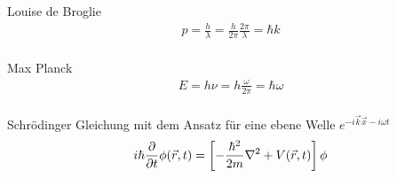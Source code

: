 




{\Huge
Louise de Broglie
\\
\begin{align*}
p=\frac{h}{\lambda} = \frac{h}{2\pi}\frac{2\pi}{\lambda} =\hbar k
\end{align*}
\\
Max Planck
\\
\begin{align*}
E=h\nu=h\frac{\omega}{2\pi} =\hbar \omega
\end{align*}
\\
Schr\"{o}dinger Gleichung mit dem Ansatz f\"{u}r eine ebene Welle \(e^{-i\vec k\vec x-i\omega t}\)
\\
 \begin{align*}
 i\hbar\pdiff_t \phi (\vec r,t)  = \left[-\frac{\hbar^2}{2m}\nabla^2 + V(\vec r,t)  \right]\phi
\end{align*}

}%

